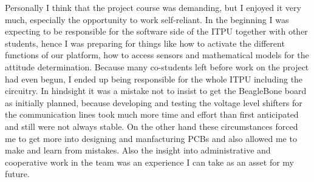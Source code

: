 Personally I think that the project course was demanding, but I enjoyed it very much, especially the opportunity to work self-reliant. In the beginning I was expecting to be responsible for the software side of the ITPU together with other students, hence I was preparing for things like how to activate the different functions of our platform, how to access sensors and mathematical models for the attitude determination. Because many co-students left before work on the project had even begun, I ended up being responsible for the whole ITPU including the circuitry. In hindsight it was a mistake not to insist to get the BeagleBone board as initially planned, because developing and testing the voltage level shifters for the communication lines took much more time and effort than first anticipated and still were not always stable. 
On the other hand these circumstances forced me to get more into designing and manfacturing PCBs and also allowed me to make and learn from mistakes. Also the insight into administrative and cooperative work in the team was an experience I can take as an asset for my future.

